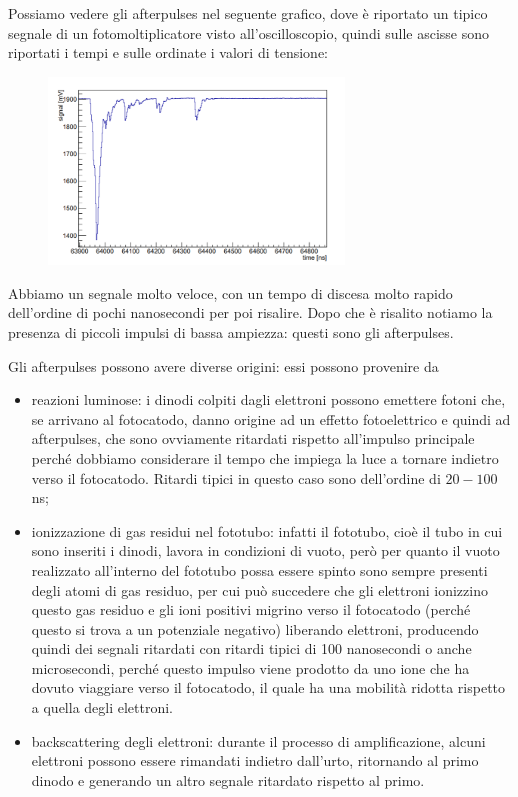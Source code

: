 Possiamo vedere gli afterpulses nel seguente grafico, dove è riportato un tipico segnale di un fotomoltiplicatore visto all'oscilloscopio, quindi sulle ascisse sono riportati i tempi e sulle ordinate i valori di tensione:
\begin{figure}[H]
   \centering
   \includegraphics[width=0.7\textwidth]{immagini/afterpulses.png}
\end{figure}
Abbiamo un segnale molto veloce, con un tempo di discesa molto rapido dell'ordine di pochi nanosecondi per poi risalire. Dopo che è risalito notiamo la presenza di piccoli impulsi di bassa ampiezza: questi sono gli afterpulses.

Gli afterpulses possono avere diverse origini: essi possono provenire da
\begin{itemize}[leftmargin=0.5cm]
   \item reazioni luminose: i dinodi colpiti dagli elettroni possono emettere fotoni che, se arrivano al fotocatodo, danno origine ad un effetto fotoelettrico e quindi ad afterpulses, che sono ovviamente ritardati rispetto all'impulso principale perché dobbiamo considerare il tempo che impiega la luce a tornare indietro verso il fotocatodo. Ritardi tipici in questo caso sono dell'ordine di $20-100$ ns;
   \item ionizzazione di gas residui nel fototubo: infatti il fototubo, cioè il tubo in cui sono inseriti i dinodi, lavora in condizioni di vuoto, però per quanto il vuoto realizzato all'interno del fototubo possa essere spinto sono sempre presenti degli atomi di gas residuo, per cui può succedere che gli elettroni ionizzino questo gas residuo e gli ioni positivi migrino verso il fotocatodo (perché questo si trova a un potenziale negativo) liberando elettroni, producendo quindi dei segnali ritardati con ritardi tipici di 100 nanosecondi o anche microsecondi, perché questo impulso viene prodotto da uno ione che ha dovuto viaggiare verso il fotocatodo, il quale ha una mobilità ridotta rispetto a quella degli elettroni.
   \item backscattering degli elettroni: durante il processo di amplificazione, alcuni elettroni possono essere rimandati indietro dall'urto, ritornando al primo dinodo e generando un altro segnale ritardato rispetto al primo.
\end{itemize}

